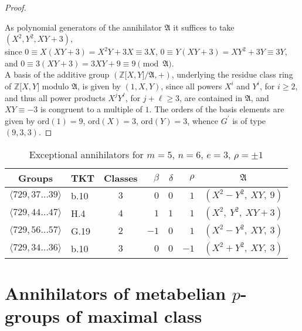 \documentclass{amsart}
\theoremstyle{definition}
\numberwithin{equation}{section}
\begin{document}
\begin{proof}
\begin{enumerate}
\end{enumerate}

\noindent
As polynomial generators of the annihilator \(\mathfrak{A}\) it suffices to take
\((X^2,Y^2,XY+3)\),\\
since
\(0\equiv X(XY+3)=X^2Y+3X\equiv 3X\), \quad
\(0\equiv Y(XY+3)=XY^2+3Y\equiv 3Y\),\\
and
\(0\equiv 3(XY+3)=3XY+9\equiv 9\pmod{\mathfrak{A}}\).\\
A basis of the additive group
\(\left(\mathbb{Z}\lbrack X,Y\rbrack/\mathfrak{A},+\right)\),
underlying the residue class ring of \(\mathbb{Z}\lbrack X,Y\rbrack\) modulo \(\mathfrak{A}\),
is given by
\((1,X,Y)\),
since all powers \(X^i\) and \(Y^i\), for \(i\ge 2\),
and thus all power products \(X^jY^\ell\), for \(j+\ell\ge 3\),
are contained in \(\mathfrak{A}\),
and \(XY\equiv -3\) is congruent to a multiple of \(1\).
The orders of the basis elements are given by
\(\mathrm{ord}(1)=9\),
\(\mathrm{ord}(X)=3\),
\(\mathrm{ord}(Y)=3\),
whence \(G^\prime\) is of type \((9,3,3)\).
\end{proof}


\begin{table}[ht]
\caption{Exceptional annihilators for \(m=5\), \(n=6\), \(e=3\), \(\rho=\pm 1\)}
\label{tbl:SmbOrdSmlCyc}
\begin{center}
\begin{tabular}{|c|l|c|rrr|c|}
\hline
 Groups                             & TKT  & Classes & \(\beta\) & \(\delta\) & \(\rho\) & \(\mathfrak{A}\)                  \\
\hline
 \(\langle 729,37\ldots 39\rangle\) & b.10 &   \(3\) &     \(0\) &      \(0\) &    \(1\) & \(\left(X^2-Y^2,\ XY,\ 9\right)\) \\
 \(\langle 729,44\ldots 47\rangle\) & H.4  &   \(4\) &     \(1\) &      \(1\) &    \(1\) & \(\left(X^2,\ Y^2,\ XY+3\right)\) \\
 \(\langle 729,56\ldots 57\rangle\) & G.19 &   \(2\) &    \(-1\) &      \(0\) &    \(1\) & \(\left(X^2-Y^2,\ XY,\ 3\right)\) \\
 \(\langle 729,34\ldots 36\rangle\) & b.10 &   \(3\) &     \(0\) &      \(0\) &   \(-1\) & \(\left(X^2+Y^2,\ XY,\ 3\right)\) \\
\hline
\end{tabular}
\end{center}
\end{table}



\section{Annihilators of metabelian \(p\)-groups of maximal class}
\label{s:MaxSmbOrdP}
\end{document}

